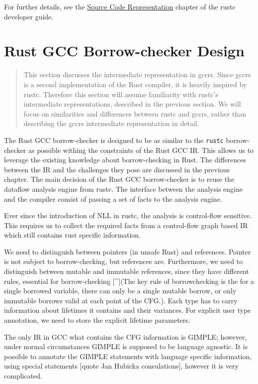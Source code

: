 For further details, see the \href{}{Source Code Representation} chapter
of the rustc developer guide.

\hypertarget{rust-gcc-borrow-checker-design}{%
\section{Rust GCC Borrow-checker
Design}\label{rust-gcc-borrow-checker-design}}

\begin{quote}
This section discusses the intermediate representation in gccrs. Since
gccrs is a second implementation of the Rust compiler, it is heavily
inspired by rustc. Therefore this section will assume familiarity with
rustc's intermediate representations, described in the previous section.
We will focus on similarities and differences between rustc and gccrs,
rather than describing the gccrs intermediate representation in detail.
\end{quote}

The Rust GCC borrow-checker is designed to be as similar to the
\texttt{rustc} borrow-checker as possible withing the constraints of the
Rust GCC IR. This allows us to leverage the existing knowledge about
borrow-checking in Rust. The differences between the IR and the
challenges they pose are discussed in the previous chapter. The main
decision of the Rust GCC borrow-checker is to reuse the dataflow
analysis engine from rustc. The interface between the analysis engine
and the compiler consist of passing a set of facts to the analysis
engine.

Ever since the introduction of NLL in rustc, the analysis is
control-flow sensitive. This requires us to collect the required facts
from a control-flow graph based IR which still contains rust specific
information.

We need to distinguish between pointers (in unsafe Rust) and references.
Pointer is not subject to borrow-checking, but references are.
Furthermore, we need to distinguish between mutable and immutable
references, since they have different rules, essential for
borrow-checking {[}\^{}{]}(The key rule of borrowchecking is the for a
single borrowed variable, there can only be a single mutable borrow, or
only immutable borrows valid at each point of the CFG.). Each type has
to carry information about lifetimes it contains and their variances.
For explicit user type annotation, we need to store the explicit
lifetime parameters.

The only IR in GCC what contains the CFG information is GIMPLE; however,
under normal circumstances GIMPLE is supposed to be language agnostic.
It is possible to annotate the GIMPLE statements with language specific
information, using special statements {[}quote Jan Hubicka
consulations{]}, however it is very complicated.


